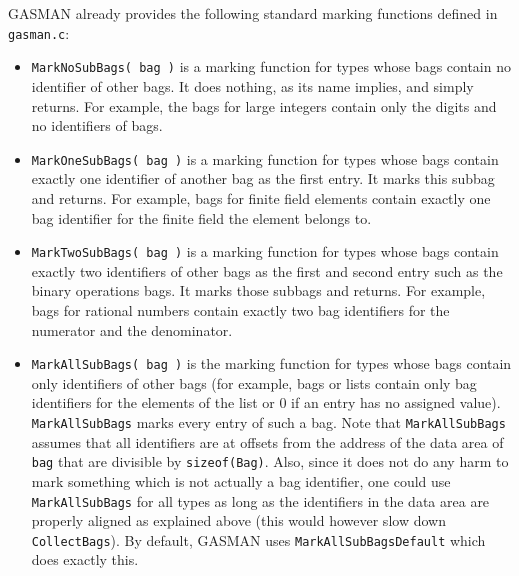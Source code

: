 \documentclass[a4paper,11pt]{report}
\begin{document}
{{{\begin{itemize}
 \textsf{GASMAN} already provides the following standard marking functions defined in \texttt{gasman.c}: 
\begin{itemize}
\item  \texttt{MarkNoSubBags( bag )} is a marking function for types whose bags contain no identifier of other
bags. It does nothing, as its name implies, and simply returns. For example,
the bags for large integers contain only the digits and no identifiers of
bags. 
\item  \texttt{MarkOneSubBags( bag )} is a marking function for types whose bags contain exactly one identifier of
another bag as the first entry. It marks this subbag and returns. For example,
bags for finite field elements contain exactly one bag identifier for the
finite field the element belongs to. 
\item  \texttt{MarkTwoSubBags( bag )} is a marking function for types whose bags contain exactly two identifiers of
other bags as the first and second entry such as the binary operations bags.
It marks those subbags and returns. For example, bags for rational numbers
contain exactly two bag identifiers for the numerator and the denominator. 
\item  \texttt{MarkAllSubBags( bag )} is the marking function for types whose bags contain only identifiers of other
bags (for example, bags or lists contain only bag identifiers for the elements
of the list or 0 if an entry has no assigned value). \texttt{MarkAllSubBags} marks every entry of such a bag. Note that \texttt{MarkAllSubBags} assumes that all identifiers are at offsets from the address of the data area
of \texttt{bag} that are divisible by \texttt{sizeof(Bag)}. Also, since it does not do any harm to mark something which is not actually
a bag identifier, one could use \texttt{MarkAllSubBags} for all types as long as the identifiers in the data area are properly aligned
as explained above (this would however slow down \texttt{CollectBags}). By default, \textsf{GASMAN} uses \texttt{MarkAllSubBagsDefault} which does exactly this. 
\end{itemize}
 
\end{itemize}
 }

 
}}
\end{document}

